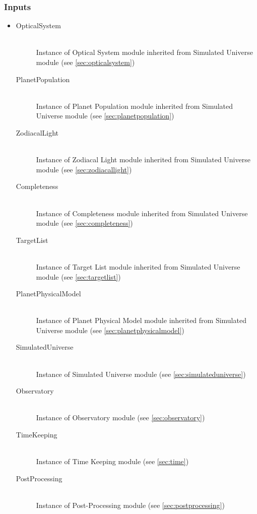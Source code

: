 \documentclass[cleanfoot]{asme2ej}
\begin{document}
\subsubsection*{Inputs}
\begin{itemize}
    \item 
    \begin{description}
        \item[OpticalSystem] \hfill \\
        Instance of Optical System module inherited from Simulated Universe module (see \ref{sec:opticalsystem})
        \item[PlanetPopulation] \hfill \\
        Instance of Planet Population module inherited from Simulated Universe module (see \ref{sec:planetpopulation})
        \item[ZodiacalLight] \hfill \\
        Instance of Zodiacal Light module inherited from Simulated Universe module (see \ref{sec:zodiacallight})
        \item[Completeness] \hfill \\
        Instance of Completeness module inherited from Simulated Universe module (see \ref{sec:completeness})
        \item[TargetList] \hfill \\
        Instance of Target List module inherited from Simulated Universe module (see \ref{sec:targetlist})
        \item[PlanetPhysicalModel] \hfill \\
        Instance of Planet Physical Model module inherited from Simulated Universe module (see \ref{sec:planetphysicalmodel})
        \item[SimulatedUniverse] \hfill \\
        Instance of Simulated Universe module (see \ref{sec:simulateduniverse})
        \item[Observatory] \hfill \\
        Instance of Observatory module (see \ref{sec:observatory})
        \item[TimeKeeping] \hfill \\
        Instance of Time Keeping module (see \ref{sec:time})
        \item[PostProcessing] \hfill \\
        Instance of Post-Processing module (see \ref{sec:postprocessing})
    \end{description}
\end{itemize}
\end{document}
